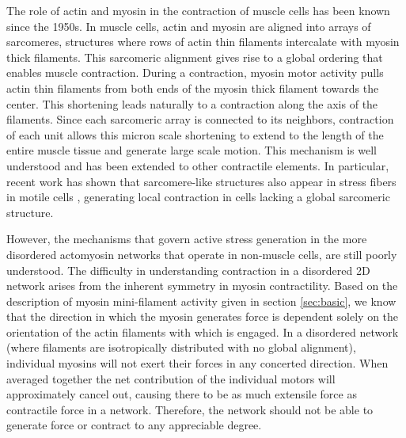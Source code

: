 The role of actin and myosin in the contraction of muscle cells has been known since the 1950s\cite{HUXLEY1954,}.  In muscle cells, actin and myosin are aligned into arrays of sarcomeres, structures where rows of actin thin filaments intercalate with myosin thick filaments\cite{Iwazumi1989}.  This sarcomeric alignment gives rise to a global ordering that enables muscle contraction. During a contraction, myosin motor activity pulls actin thin filaments from both ends of the myosin thick filament towards the center. This shortening leads naturally to a contraction along the axis of the filaments. Since each sarcomeric array is connected to its neighbors, contraction of each unit  allows this micron scale shortening to extend to the length of the entire muscle tissue and generate large scale motion.  This mechanism is well understood and has been extended to other contractile elements.  In particular, recent work has shown that sarcomere-like structures also appear in stress fibers in motile cells \cite{Kassianidou20153065}, generating local contraction in cells lacking a global sarcomeric structure. 

However, the mechanisms that govern  active stress generation in the more disordered actomyosin networks that operate in non-muscle cells, are still poorly understood. The difficulty in understanding contraction in a disordered 2D network arises from the inherent symmetry in myosin contractility.  Based on the description of myosin mini-filament activity given in section \ref{sec:basic}, we know that the direction in which the myosin generates force is dependent solely on the orientation of the actin filaments with which is engaged.  In a disordered network (where filaments are isotropically distributed with no global alignment), individual myosins will not exert their forces in any concerted direction. When averaged together the net contribution of the individual motors will approximately cancel out, causing there to be as much extensile force as contractile force in a network.  Therefore, the network should not be able to generate force or contract to any appreciable degree.

